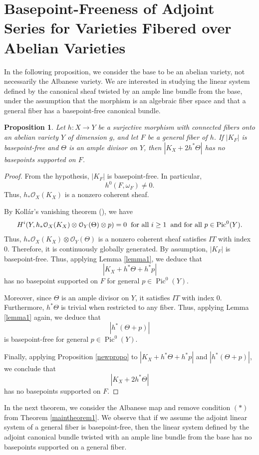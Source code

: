 \documentclass[sn-mathphys-num]{sn-jnl}%
\newtheorem{proposition}[theorem]{Proposition}
\theoremstyle{definition}
\numberwithin{equation}{section}
\begin{document}
\section{Basepoint-Freeness of
Adjoint Series for Varieties Fibered over Abelian Varieties}
\par In the following proposition, we consider the base to be an abelian variety, not necessarily the Albanese variety.  We are interested in studying the linear system defined by the canonical sheaf twisted by an ample line bundle from the base, under the assumption that the morphism is an algebraic fiber space and that a general fiber has a basepoint-free canonical bundle.
\begin{proposition}\label{kollarvanishing}
    Let $h: X \to Y$ be a surjective morphism with connected fibers onto an abelian variety $Y$ of dimension $g$, and let $F$ be a general fiber of $h$. If $|K_{F}|$ is basepoint-free and $\Theta$ is an ample divisor on $Y$, then $|K_{X} + 2 h^{*}\Theta|$ has no basepoints supported on $F$.
\end{proposition}
\begin{proof}
From the hypothesis, $|K_{F}|$ is basepoint-free. In particular,
$$h^{0}(F, \omega_{F}) \neq 0\text{.}$$
Thus, $h_{*}\mathcal{O}_{X}(K_{X})$ is a nonzero coherent sheaf.
   \par  By Kollár's vanishing theorem (\cite[Theorem 2.1]{kollarhigherdirect}), we have $$H^{i}(Y, h_{*}\mathcal{O}_{X}(K_{X}) \otimes \mathcal{O}_{Y}(\Theta) \otimes p) = 0 \hspace{0.2cm} \text{for all }  i \geq 1 \hspace{0.2cm} 
    \text{and for all }  p \in \operatorname{Pic}^{0}(Y). $$ Thus, $h_{*}\mathcal{O}_{X}(K_{X}) \otimes \mathcal{O}_{Y}(\Theta)$ is a nonzero coherent sheaf satisfies $IT$ with index $0$. Therefore, it is continuously globally generated. By assumption, $|K_{F}|$ is basepoint-free. Thus, applying Lemma \ref{lemma1}, we deduce that $$|K_{X} + h^{*}\Theta + h^{*}p|$$ has no basepoint supported on $F$ for general $p \in \operatorname{Pic}^{0}(Y)$. 
\par Moreover, since $\Theta$ is an ample divisor on $Y$, it satisfies $IT$ with index $0$. Furthermore, $h^{*}\Theta$ is trivial when  restricted to any fiber. Thus, applying Lemma \ref{lemma1} again, we deduce that  $$|h^{*}(\Theta + p)|$$ is basepoint-free for general $p \in \operatorname{Pic}^{0}(Y)$. 
\par Finally, applying Proposition \ref{newpropo} to $|K_{X} + h^{*}\Theta + h^{*}p|$ and $|h^{*}(\Theta + p)|$, we conclude that $$|K_{X} + 2 h^{*}\Theta|$$ has no basepoints supported on $F$.
\end{proof}
\par In the next theorem, we consider the Albanese map and  remove  condition $(*)$ from Theorem \ref{maintheorem1}. We observe that if we assume the adjoint linear system of a general fiber is basepoint-free, then the linear system defined by the adjoint canonical bundle twisted with an ample line bundle from the base has no basepoints supported on a general fiber.
\end{document}
